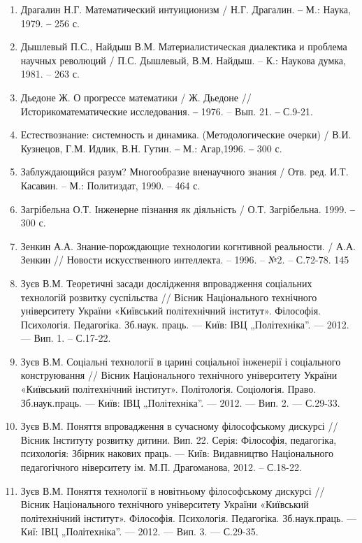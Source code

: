 \begin{enumerate}
\item Драгалин Н.Г. Математический интуиционизм / Н.Г. Драгалин. ‒ М.:
Наука, 1979. ‒ 256 с.

\item Дышлевый П.С., Найдыш В.М. Материалистическая диалектика и
проблема научных революций / П.С. Дышлевый, В.М. Найдыш. – К.: Наукова
думка, 1981. – 263 с.

\item Дьедоне Ж. О прогрессе математики / Ж. Дьедоне // Историкоматематические
исследования. ‒ 1976. – Вып. 21. ‒ С.9-21.

\item Естествознание: системность и динамика. (Методологические очерки) /
В.И. Кузнецов, Г.М. Идлик, В.Н. Гутин. ‒ М.: Агар,1996. ‒ 300 с.

\item Заблуждающийся разум? Многообразие вненаучного знания / Отв. ред.
И.Т. Касавин. – М.: Политиздат, 1990. – 464 с.

\item Загрібельна О.Т. Інженерне пізнання як діяльність / О.Т. Загрібельна.
1999. ‒ 300 с.

\item Зенкин А.А. Знание-порождающие технологии когнтивной реальности. /
А.А. Зенкин // Новости искусственного интеллекта. – 1996. – №2. – С.72-78.
145

\item Зуєв В.М. Теоретичні засади дослідження впровадження соціальних
технологій розвитку суспільства // Вісник Національного технічного
університету України «Київський політехнічний інститут». Філософія.
Психологія. Педагогіка. Зб.наук. праць. --- Київ: ІВЦ „Політехніка”. --- 2012. ---
Вип. 1. – С.17-22.

\item Зуєв В.М. Соціальні технології в царині соціальної інженерії і
соціального конструювання // Вісник Національного технічного університету
України «Київський політехнічний інститут». Політологія. Соціологія. Право.
Зб.наук.праць. --- Київ: ІВЦ „Політехніка”. --- 2012. --- Вип. 2. --- С.29-33.

\item Зуєв В.М. Поняття впровадження в сучасному філософському дискурсі //
Вісник Інституту розвитку дитини. Вип. 22. Серія: Філософія, педагогіка,
психологія: Збірник накових праць. --- Київ: Видавництво Національного
педагогічного ніверситету ім. М.П. Драгоманова, 2012. – С.18-22.

\item Зуєв В.М. Поняття технології в новітньому філософському дискурсі //
Вісник Національного технічного університету України «Київський
політехнічний інститут». Філософія. Психологія. Педагогіка. Зб.наук.праць. ---
Киї: ІВЦ „Політехніка”. --- 2012. --- Вип. 3. --- С.29-35.


\end{enumerate}
